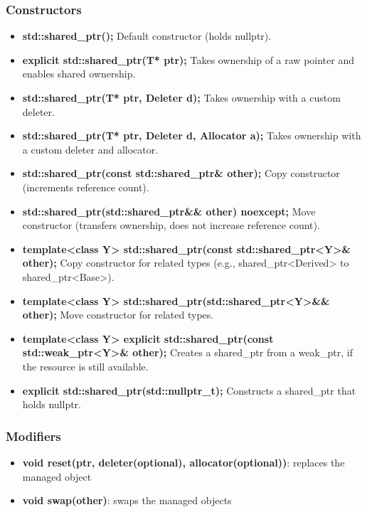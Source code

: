 \documentclass{report}
\begin{document}
        \subsubsection{Constructors}
        \bigbreak \noindent 
        \begin{itemize}
            \item \textbf{std::shared\_ptr();}	Default constructor (holds nullptr).
            \item \textbf{explicit std::shared\_ptr(T* ptr);}	Takes ownership of a raw pointer and enables shared ownership.
            \item \textbf{std::shared\_ptr(T* ptr, Deleter d);}	Takes ownership with a custom deleter.
            \item \textbf{std::shared\_ptr(T* ptr, Deleter d, Allocator a);}	Takes ownership with a custom deleter and allocator.
            \item \textbf{std::shared\_ptr(const std::shared\_ptr\& other);}	Copy constructor (increments reference count).
            \item \textbf{std::shared\_ptr(std::shared\_ptr\&\& other) noexcept;}	Move constructor (transfers ownership, does not increase reference count).
            \item \textbf{template<class Y> std::shared\_ptr(const std::shared\_ptr<Y>\& other);}	Copy constructor for related types (e.g., shared\_ptr<Derived> to shared\_ptr<Base>).
            \item \textbf{template<class Y> std::shared\_ptr(std::shared\_ptr<Y>\&\& other);}	Move constructor for related types.
            \item \textbf{template<class Y> explicit std::shared\_ptr(const std::weak\_ptr<Y>\& other);}	Creates a shared\_ptr from a weak\_ptr, if the resource is still available.
            \item \textbf{explicit std::shared\_ptr(std::nullptr\_t);}	Constructs a shared\_ptr that holds nullptr.
        \end{itemize}

        \bigbreak \noindent 
        \subsubsection{Modifiers}
        \begin{itemize}
            \item \textbf{void reset(ptr, deleter(optional), allocator(optional))}: replaces the managed object
            \item \textbf{void swap(other)}: swaps the managed objects
        \end{itemize}
\end{document}
